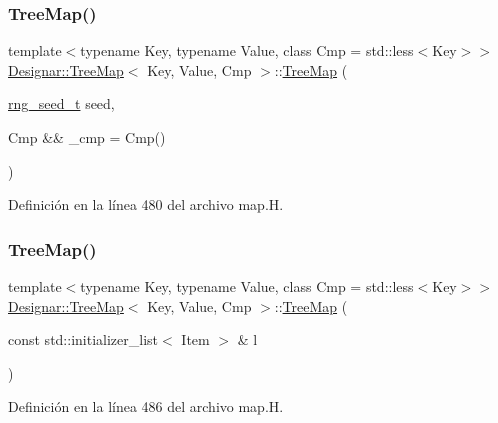 \subsubsection{\texorpdfstring{Tree\+Map()}{TreeMap()}\hspace{0.1cm}{\footnotesize\ttfamily [4/7]}}
{\footnotesize\ttfamily template$<$typename Key, typename Value, class Cmp = std\+::less$<$\+Key$>$$>$ \\
\hyperlink{class_designar_1_1_tree_map}{Designar\+::\+Tree\+Map}$<$ Key, Value, Cmp $>$\+::\hyperlink{class_designar_1_1_tree_map}{Tree\+Map} (\begin{DoxyParamCaption}\item[{\hyperlink{namespace_designar_ad621b5646d45288c5d6a1e1dfe7531a8}{rng\+\_\+seed\+\_\+t}}]{seed,  }\item[{Cmp \&\&}]{\+\_\+cmp = {\ttfamily Cmp()} }\end{DoxyParamCaption})\hspace{0.3cm}{\ttfamily [inline]}}



Definición en la línea 480 del archivo map.\+H.

\mbox{\label{class_designar_1_1_tree_map_add7b0ee1ebafb7894771c14029e2aeca}} 
\subsubsection{\texorpdfstring{Tree\+Map()}{TreeMap()}\hspace{0.1cm}{\footnotesize\ttfamily [5/7]}}
{\footnotesize\ttfamily template$<$typename Key, typename Value, class Cmp = std\+::less$<$\+Key$>$$>$ \\
\hyperlink{class_designar_1_1_tree_map}{Designar\+::\+Tree\+Map}$<$ Key, Value, Cmp $>$\+::\hyperlink{class_designar_1_1_tree_map}{Tree\+Map} (\begin{DoxyParamCaption}\item[{const std\+::initializer\+\_\+list$<$ Item $>$ \&}]{l }\end{DoxyParamCaption})\hspace{0.3cm}{\ttfamily [inline]}}



Definición en la línea 486 del archivo map.\+H.

\mbox{\label{class_designar_1_1_tree_map_a5b71308661829869487a7c904a37fb09}} 
